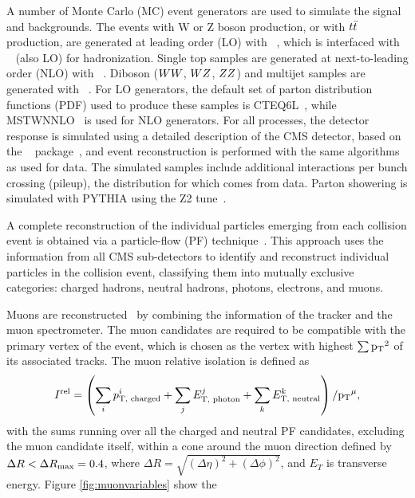 A number of Monte Carlo (MC) event generators are used to simulate the signal and
backgrounds. 
The  events with W or Z boson production, or with $t\bar{t}$ production, are generated at leading order (LO) 
with ~\cite{Madgraph5}, which is interfaced with ~\cite{Sjostrand:2006za} (also LO)
for hadronization.
Single top samples are generated at next-to-leading order (NLO) with 
~\cite{Alioli:2008gx,Nason:2004rx,Frixione:2007vw}.
Diboson ($WW$, $WZ$, $ZZ$) and multijet samples are
generated with 
~\cite{Sjostrand:2006za}. 
For LO generators, the default set of parton distribution functions
(PDF) used to produce these samples is CTEQ6L~\cite{CTEQ66}, while
MSTWNNLO~\cite{Martin:2009iq} is used for NLO generators.
For all processes, the detector response is simulated using a detailed
description of the CMS detector, based on the \GEANTfour~
package~\cite{GEANT}, and event reconstruction is performed with
the same algorithms as used for data.
The simulated samples include additional interactions per bunch crossing (pileup),
the distribution for which comes from data.
Parton showering is simulated with PYTHIA using the Z2 tune~\cite{Field:2010bc}.

A complete reconstruction of the individual particles emerging from each collision event is obtained 
via a particle-flow (PF) technique~\cite{CMS-PAS-PFT-09-001, CMS-PAS-PFT-10-002}. This 
approach uses the information from all CMS sub-detectors to identify and 
reconstruct individual particles in the collision event, classifying 
them into mutually exclusive categories: charged hadrons, neutral hadrons, photons, electrons, and muons.

Muons are reconstructed~\cite{CMS-PAS-MUO-10-002}
by combining the information of the tracker and the muon spectrometer.
The muon candidates are required to be compatible with the primary vertex of the
event, which is chosen as the vertex with highest $\sum \mathrm{p_{T}}^2$ of its associated tracks.
The muon relative isolation is defined as
\begin{equation*}
I^{\rm{rel}} = \left( \sum_{i}
p_{\text{T, charged}}^i+ \sum_{j}  E_{\text{T, photon}}^j  +\sum_{k}  E_{\text{T, neutral}}^k \right) /\mathrm{p_{T}}^{\mu},
\end{equation*}
with the sums running over all the charged and neutral PF candidates,
excluding the muon candidate itself, 
within a cone around the muon direction
defined by  $\Delta R  < \Delta R_{\rm max} = 0.4$,
where
$\Delta R = \sqrt { (\Delta \eta)^2 + (\Delta \phi)^2 }$, and
$E_{T}$ is 
transverse energy.
Figure \ref{fig:muonvariables} show the

